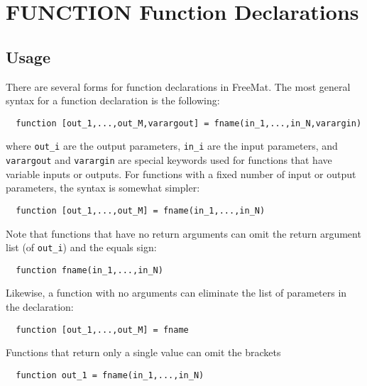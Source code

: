 \section{FUNCTION Function Declarations}

\subsection{Usage}

There are several forms for function declarations in FreeMat.
The most general syntax for a function declaration is the 
following:
\begin{verbatim}
  function [out_1,...,out_M,varargout] = fname(in_1,...,in_N,varargin)
\end{verbatim}
where \verb|out_i| are the output parameters, \verb|in_i| are the input
parameters, and \verb|varargout| and \verb|varargin| are special keywords
used for functions that have variable inputs or outputs.  For 
functions with a fixed number of input or output parameters, the 
syntax is somewhat simpler:
\begin{verbatim}
  function [out_1,...,out_M] = fname(in_1,...,in_N)
\end{verbatim}
Note that functions that have no return arguments can omit
the return argument list (of \verb|out_i|) and the equals sign:
\begin{verbatim}
  function fname(in_1,...,in_N)
\end{verbatim}
Likewise, a function with no arguments can eliminate the list
of parameters in the declaration:
\begin{verbatim}
  function [out_1,...,out_M] = fname
\end{verbatim}
Functions that return only a single value can omit the brackets
\begin{verbatim}
  function out_1 = fname(in_1,...,in_N)
\end{verbatim}

